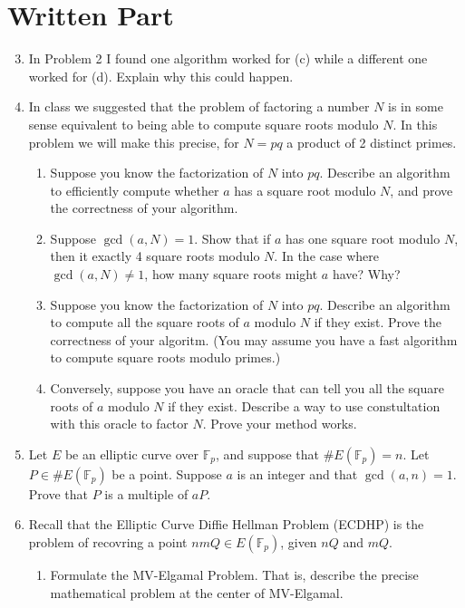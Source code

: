 \documentclass[11pt]{article}
\newcommand{\bF}{\mathbb{F}}
\begin{document}
\section*{Written Part}
\begin{enumerate}
  \setcounter{enumi}{2}
  \item{
  In Problem 2 I found one algorithm worked for (c) while a different one worked for (d).  Explain why this could happen.
  }
  \item{
  In class we suggested that the problem of factoring a number $N$ is in some sense equivalent to being able to compute square roots modulo $N$.  In
  this problem we will make this precise, for $N=pq$ a product of 2 distinct primes.
  \begin{enumerate}
    \item{
    Suppose you know the factorization of $N$ into $pq$.  Describe an algorithm to efficiently compute whether $a$ has a square root modulo $N$, and prove the correctness of your algorithm.
    }
    \item{
    Suppose $\gcd(a,N)=1$.  Show that if $a$ has one square root modulo $N$, then it exactly 4 square roots modulo $N$.  In the case where $\gcd(a,N)\not=1$, how many square roots might $a$ have? Why?
    }
    \item{
    Suppose you know the factorization of $N$ into $pq$.  Describe an algorithm to compute all the square roots of $a$ modulo $N$ if they exist.  Prove the correctness of your algoritm.  (You may assume you have a fast algorithm to compute square roots modulo primes.)
    }
    \item{
    Conversely, suppose you have an oracle that can tell you all the square roots of $a$ modulo $N$ if they exist.  Describe a way to use constultation with this oracle to factor $N$.  Prove your method works.
    }
  \end{enumerate}
  }
  \item{
  Let $E$ be an elliptic curve over $\bF_p$, and suppose that $\#E(\bF_p) = n$.  Let $P\in\#E(\bF_p)$ be a point.  Suppose $a$ is an integer and that $\gcd(a,n)=1$.  Prove that $P$ is a multiple of $aP$.
  }
  \item{
  Recall that the Elliptic Curve Diffie Hellman Problem (ECDHP) is the problem of recovring a point $nmQ\in E(\bF_p)$, given $nQ$ and $mQ$.
  \begin{enumerate}
    \item{
    Formulate the MV-Elgamal Problem.  That is, describe the precise mathematical problem at the center of MV-Elgamal.
}
\end{enumerate}}
\end{enumerate}
\end{document}
